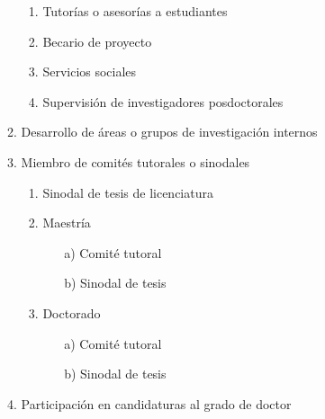\documentclass[12pt]{report}
\begin{document}
\begin{enumerate}
\begin{enumerate}
\begin{enumerate}
                        \item Tutorías o asesorías a estudiantes
                        \item Becario de proyecto
                        \item Servicios sociales
                        \item Supervisión de investigadores posdoctorales
                        \end{enumerate}
                \item Desarrollo de áreas o grupos de investigación internos
                \item Miembro de comités tutorales o sinodales
                        \begin{enumerate}
                        \item Sinodal de tesis de licenciatura
                        \item Maestría
                                \begin{itemize}
                                \item[a)] Comité tutoral
                                \item[b)] Sinodal de tesis
                                \end{itemize}
                        \item Doctorado
                                \begin{itemize}
                                \item[a)] Comité tutoral
                                \item[b)] Sinodal de tesis
                                \end{itemize}
                        \end{enumerate}
                \item Participación en candidaturas al grado de doctor
                \end{enumerate}


\end{enumerate}
\end{document}

